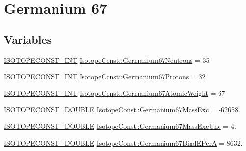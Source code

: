 \hypertarget{group___isotope_const-_germanium-_ge67}{}\section{Germanium 67}
\label{group___isotope_const-_germanium-_ge67}
\subsection*{Variables}
\begin{DoxyCompactItemize}
\item 
\mbox{\hyperlink{group___isotope_const-_macros_ga5f18360b3e99483a35c32d789e62621c}{I\+S\+O\+T\+O\+P\+E\+C\+O\+N\+S\+T\+\_\+\+I\+NT}} \mbox{\hyperlink{group___isotope_const-_germanium-_ge67_gab32f1a34d6d76ba099d584b73e8857f6}{Isotope\+Const\+::\+Germanium67\+Neutrons}} = 35
\item 
\mbox{\hyperlink{group___isotope_const-_macros_ga5f18360b3e99483a35c32d789e62621c}{I\+S\+O\+T\+O\+P\+E\+C\+O\+N\+S\+T\+\_\+\+I\+NT}} \mbox{\hyperlink{group___isotope_const-_germanium-_ge67_ga55fc2a8787c4dcb307adf001b5aaadf3}{Isotope\+Const\+::\+Germanium67\+Protons}} = 32
\item 
\mbox{\hyperlink{group___isotope_const-_macros_ga5f18360b3e99483a35c32d789e62621c}{I\+S\+O\+T\+O\+P\+E\+C\+O\+N\+S\+T\+\_\+\+I\+NT}} \mbox{\hyperlink{group___isotope_const-_germanium-_ge67_gac320c31f67811f69966de525454735f0}{Isotope\+Const\+::\+Germanium67\+Atomic\+Weight}} = 67
\item 
\mbox{\hyperlink{group___isotope_const-_macros_ga8f45a7272ce02c0b4c65c44636ed719a}{I\+S\+O\+T\+O\+P\+E\+C\+O\+N\+S\+T\+\_\+\+D\+O\+U\+B\+LE}} \mbox{\hyperlink{group___isotope_const-_germanium-_ge67_gae5ce7d8fdd04dc08b011a82e87ffc02f}{Isotope\+Const\+::\+Germanium67\+Mass\+Exc}} = -\/62658.
\item 
\mbox{\hyperlink{group___isotope_const-_macros_ga8f45a7272ce02c0b4c65c44636ed719a}{I\+S\+O\+T\+O\+P\+E\+C\+O\+N\+S\+T\+\_\+\+D\+O\+U\+B\+LE}} \mbox{\hyperlink{group___isotope_const-_germanium-_ge67_gaf29cbbcfd220fb0a5720e265ffd16c7f}{Isotope\+Const\+::\+Germanium67\+Mass\+Exc\+Unc}} = 4.
\item 
\mbox{\hyperlink{group___isotope_const-_macros_ga8f45a7272ce02c0b4c65c44636ed719a}{I\+S\+O\+T\+O\+P\+E\+C\+O\+N\+S\+T\+\_\+\+D\+O\+U\+B\+LE}} \mbox{\hyperlink{group___isotope_const-_germanium-_ge67_gab392630c32a854369224b6b7aa5e840e}{Isotope\+Const\+::\+Germanium67\+Bind\+E\+PerA}} = 8632.
\item 

\end{DoxyCompactItemize}
